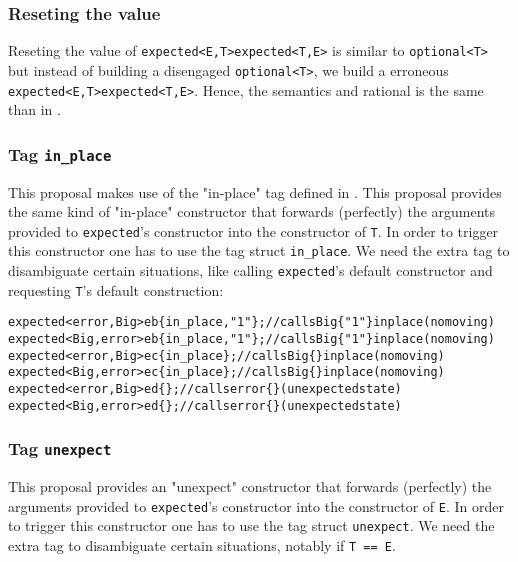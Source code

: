 \documentclass[a4paper,10pt]{article}
\newcommand{\cpp}[1]{\lstinline{#1}}
\newcommand{\suppress}[1]{\colorbox{suppress_color}{#1}}
\newcommand{\update}[1]{\colorbox{update_color}{#1}}
\begin{document}
\subsubsection{Reseting the value}

Reseting the value of \suppress{\cpp{expected<E,T>}}\update{\cpp{expected<T,E>}} is similar to \cpp{optional<T>} but instead of building a disengaged \cpp{optional<T>}, we build a erroneous \suppress{\cpp{expected<E,T>}}\update{\cpp{expected<T,E>}}. Hence, the semantics and rational is the same than in \cite{OptionalRev4}.

\subsubsection{Tag \cpp{in_place}}

This proposal makes use of the "in-place" tag defined in \cite{OptionalRev5}. This proposal  provides the same kind of "in-place" constructor that forwards (perfectly) the arguments provided to \cpp{expected}'s constructor into the constructor of \cpp{T}. In order to trigger this constructor one has to use the tag struct \cpp{in_place}. We need the extra tag to disambiguate certain situations, like calling \cpp{expected}'s default constructor and requesting \cpp{T}'s default construction:

\begin{alltt}
\suppress{expected<error, Big> eb\{in_place, "1"\}; // calls Big\{"1"\} in place (no moving)}
\update{expected<Big, error> eb\{in_place, "1"\}; // calls Big\{"1"\} in place (no moving)}
\suppress{expected<error, Big> ec\{in_place\};      // calls Big\{\} in place (no moving)}
\update{expected<Big, error> ec\{in_place\};      // calls Big\{\} in place (no moving)}
\suppress{expected<error, Big> ed\{\};              // calls error\{\} (unexpected state)}
\update{expected<Big, error> ed\{\};              // calls error\{\} (unexpected state)}
\end{alltt}


\subsubsection{Tag \cpp{unexpect}}

This proposal provides an "unexpect" constructor that forwards (perfectly) the arguments provided to \cpp{expected}'s constructor into the constructor of \cpp{E}. In order to trigger this constructor one has to use the tag struct \cpp{unexpect}. We need the extra tag to disambiguate certain situations, notably if \cpp{T == E}.
\end{document}
